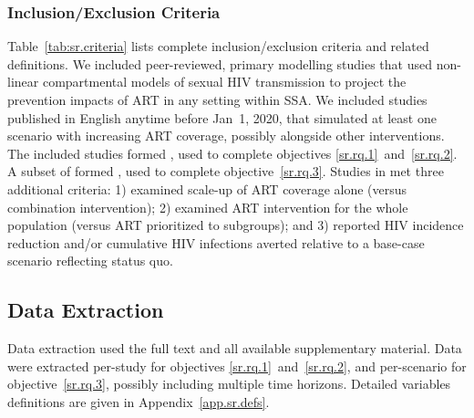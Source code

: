 \subsubsection{Inclusion/Exclusion Criteria}\label{sr.meth.search.inex}
Table~\ref{tab:sr.criteria} lists complete inclusion/exclusion criteria and related definitions.
We included peer-reviewed, primary modelling studies that used
non-linear compartmental models of sexual HIV transmission
to project the prevention impacts of ART in any setting within SSA.
We included studies published in English anytime before Jan~1, 2020,
that simulated at least one scenario with increasing ART coverage,
possibly alongside other interventions.
The included studies formed , used to complete objectives \ref{sr.rq.1}~and~\ref{sr.rq.2}.
A subset of  formed , used to complete objective~\ref{sr.rq.3}.
Studies in  met three additional criteria:
1) examined scale-up of ART coverage alone (versus combination intervention);
2) examined ART intervention for the whole population (versus ART prioritized to subgroups); and
3) reported HIV incidence reduction and/or cumulative HIV infections averted
relative to a base-case scenario reflecting status quo.
\subsection{Data Extraction}\label{sr.meth.data}
Data extraction used the full text and all available supplementary material.
Data were extracted per-study for objectives \ref{sr.rq.1}~and~\ref{sr.rq.2}, and
per-scenario for objective~\ref{sr.rq.3}, possibly including multiple time horizons.
Detailed variables definitions are given in Appendix~\ref{app.sr.defs}.
